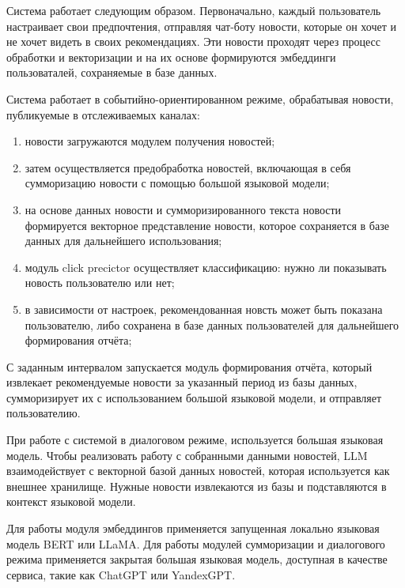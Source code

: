 Система работает следующим образом. Первоначально, каждый пользователь настраивает свои предпочтения, отправляя чат-боту новости, которые он хочет и не хочет видеть в своих рекомендациях. Эти новости проходят через процесс обработки и векторизации и на их основе формируются эмбеддинги пользоваталей, сохраняемые в базе данных.

Система работает в событийно-ориентированном режиме, обрабатывая новости, публикуемые в отслеживаемых каналах:
\begin{enumerate}
    \item новости загружаются модулем получения новостей;
    \item затем осуществляется предобработка новостей, включающая в себя сумморизацию новости с помощью большой языковой модели;
    \item на основе данных новости и сумморизированного текста новости формируется векторное представление новости, которое сохраняется в базе данных для дальнейшего использования;
    \item модуль click precictor осуществляет классификацию: нужно ли показывать новость пользователю или нет;
    \item в зависимости от настроек, рекомендованная новсть может быть показана пользователю, либо сохранена в базе данных пользователей для дальнейшего формирования отчёта;
\end{enumerate}

С заданным интервалом запускается модуль формирования отчёта, который извлекает рекомендуемые новости за указанный период из базы данных, сумморизирует их с использованием большой языковой модели, и отправляет пользователию.

При работе с системой в диалоговом режиме, используется большая языковая модель. Чтобы реализовать работу с собранными данными новостей, LLM взаимодействует с векторной базой данных новостей, которая используется как внешнее хранилище. Нужные новости извлекаются из базы и подставляются в контекст языковой модели.

Для работы модуля эмбеддингов применяется запущенная локально языковая модель BERT или LLaMA. Для работы модулей сумморизации и диалогового режима применяется закрытая большая языковая модель, доступная в качестве сервиса, такие как ChatGPT или YandexGPT.
